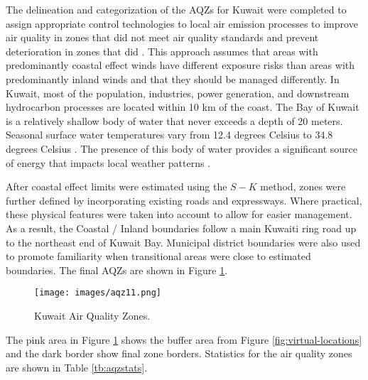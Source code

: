  The delineation and categorization of the AQZs for Kuwait were completed to assign appropriate control technologies to local air emission processes to improve air quality in zones that did not meet air quality standards and prevent deterioration in zones that did \citep{Carr2012}. This approach assumes that areas with predominantly coastal effect winds have different exposure risks than areas with predominantly inland winds and that they should be managed differently.  In Kuwait, most of the population, industries, power generation, and downstream hydrocarbon processes are located within 10 km of the coast.  The Bay of Kuwait is a relatively shallow body of water that never exceeds a depth of 20 meters.  Seasonal surface water temperatures vary from 12.4 degrees Celsius to 34.8 degrees Celsius \citep{Al-Mutairi2014}.  The presence of this body of water provides a significant source of energy that impacts local weather patterns \citep{Mizak2007, Panin2005}. 

After coastal effect limits were estimated using the $S-K$ method, zones were further defined by incorporating existing roads and expressways.  Where practical, these physical features were taken into account to allow for easier management.  As a result, the Coastal / Inland boundaries follow a main Kuwaiti ring road up to the northeast end of Kuwait Bay.  Municipal district boundaries were also used to promote familiarity when transitional areas were close to estimated boundaries.  The final AQZs are shown in Figure \ref{fig:kuwaitzones}.

%
\begin{figure}[H]
\texttt{[image: images/aqz11.png]} 
\caption{Kuwait Air Quality Zones.}
\label{fig:kuwaitzones}
\end{figure}
%

The pink area in Figure \ref{fig:kuwaitzones} shows the buffer area from Figure \ref{fig:virtual-locations} and the dark border show final zone borders. Statistics for the air quality zones are shown in Table \ref{tb:aqzstats}.

